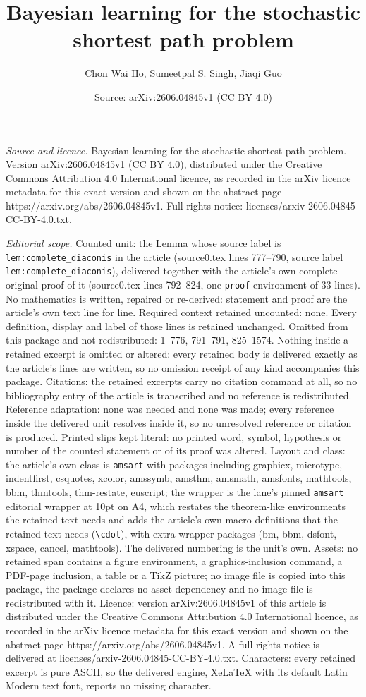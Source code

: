 \documentclass[10pt,a4paper]{amsart}
\title[Bayesian learning for the stochastic shortest path problem]{Bayesian learning for the stochastic shortest path problem}
\author{Chon Wai Ho, Sumeetpal S. Singh, Jiaqi Guo}
\date{Source: arXiv:2606.04845v1 (CC BY 4.0)}
\begin{document}
\maketitle

\noindent\emph{Source and licence.} Bayesian learning for the stochastic shortest path problem. Version arXiv:2606.04845v1 (CC BY 4.0), distributed under the Creative Commons Attribution 4.0 International licence, as recorded in the arXiv licence metadata for this exact version and shown on the abstract page https://arxiv.org/abs/2606.04845v1. Full rights notice: licenses/arxiv-2606.04845-CC-BY-4.0.txt.\par\smallskip

\noindent\textit{Editorial scope.} Counted unit: the Lemma whose source label is \texttt{lem:complete\_diaconis} in the article (source0.tex lines 777--790, source label \texttt{lem:complete\_diaconis}), delivered together with the article's own complete original proof of it (source0.tex lines 792--824, one \texttt{proof} environment of 33 lines). No mathematics is written, repaired or re-derived: statement and proof are the article's own text line for line. Required context retained uncounted: none. Every definition, display and label of those lines is retained unchanged. Omitted from this package and not redistributed: 1--776, 791--791, 825--1574. Nothing inside a retained excerpt is omitted or altered: every retained body is delivered exactly as the article's lines are written, so no omission receipt of any kind accompanies this package. Citations: the retained excerpts carry no citation command at all, so no bibliography entry of the article is transcribed and no reference is redistributed. Reference adaptation: none was needed and none was made; every reference inside the delivered unit resolves inside it, so no unresolved reference or citation is produced. Printed slips kept literal: no printed word, symbol, hypothesis or number of the counted statement or of its proof was altered. Layout and class: the article's own class is \texttt{amsart} with packages including graphicx, microtype, indentfirst, csquotes, xcolor, amssymb, amsthm, amsmath, amsfonts, mathtools, bbm, thmtools, thm-restate, euscript; the wrapper is the lane's pinned \texttt{amsart} editorial wrapper at 10pt on A4, which restates the theorem-like environments the retained text needs and adds the article's own macro definitions that the retained text needs (\texttt{\textbackslash cdot}), with extra wrapper packages (bm, bbm, dsfont, xspace, cancel, mathtools). The delivered numbering is the unit's own. Assets: no retained span contains a figure environment, a graphics-inclusion command, a PDF-page inclusion, a table or a TikZ picture; no image file is copied into this package, the package declares no asset dependency and no image file is redistributed with it. Licence: version arXiv:2606.04845v1 of this article is distributed under the Creative Commons Attribution 4.0 International licence, as recorded in the arXiv licence metadata for this exact version and shown on the abstract page https://arxiv.org/abs/2606.04845v1. A full rights notice is delivered at licenses/arxiv-2606.04845-CC-BY-4.0.txt. Characters: every retained excerpt is pure ASCII, so the delivered engine, XeLaTeX with its default Latin Modern text font, reports no missing character.
\end{document}
